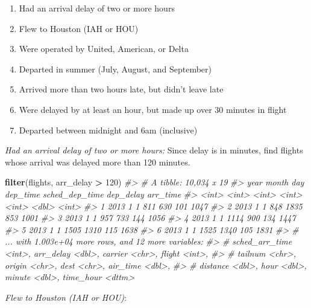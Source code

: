\documentclass[]{book}
\newenvironment{Shaded}{\begin{snugshade}}{\end{snugshade}}
\newcommand{\CommentTok}[1]{\textcolor[rgb]{0.56,0.35,0.01}{\textit{#1}}}
\newcommand{\DecValTok}[1]{\textcolor[rgb]{0.00,0.00,0.81}{#1}}
\newcommand{\KeywordTok}[1]{\textcolor[rgb]{0.13,0.29,0.53}{\textbf{#1}}}
\newcommand{\NormalTok}[1]{#1}
\newcommand{\OperatorTok}[1]{\textcolor[rgb]{0.81,0.36,0.00}{\textbf{#1}}}
\newcommand{\StringTok}[1]{\textcolor[rgb]{0.31,0.60,0.02}{#1}}
\providecommand{\tightlist}{%
  \setlength{\itemsep}{0pt}\setlength{\parskip}{0pt}}
\theoremstyle{plain}
\theoremstyle{remark}
\theoremstyle{definition}
\theoremstyle{definition}
\theoremstyle{definition}
\theoremstyle{remark}
\begin{document}
\begin{enumerate}
\def\labelenumi{\arabic{enumi}.}
\tightlist
\item
  Had an arrival delay of two or more hours
\item
  Flew to Houston (IAH or HOU)
\item
  Were operated by United, American, or Delta
\item
  Departed in summer (July, August, and September)
\item
  Arrived more than two hours late, but didn't leave late
\item
  Were delayed by at least an hour, but made up over 30 minutes in
  flight
\item
  Departed between midnight and 6am (inclusive)
\end{enumerate}

\emph{Had an arrival delay of two or more hours:} Since delay is in
minutes, find flights whose arrival was delayed more than 120 minutes.

\begin{Shaded}
\begin{Highlighting}[]
\KeywordTok{filter}\NormalTok{(flights, arr_delay }\OperatorTok{>}\StringTok{ }\DecValTok{120}\NormalTok{)}
\CommentTok{#> # A tibble: 10,034 x 19}
\CommentTok{#>    year month   day dep_time sched_dep_time dep_delay arr_time}
\CommentTok{#>   <int> <int> <int>    <int>          <int>     <dbl>    <int>}
\CommentTok{#> 1  2013     1     1      811            630       101     1047}
\CommentTok{#> 2  2013     1     1      848           1835       853     1001}
\CommentTok{#> 3  2013     1     1      957            733       144     1056}
\CommentTok{#> 4  2013     1     1     1114            900       134     1447}
\CommentTok{#> 5  2013     1     1     1505           1310       115     1638}
\CommentTok{#> 6  2013     1     1     1525           1340       105     1831}
\CommentTok{#> # ... with 1.003e+04 more rows, and 12 more variables:}
\CommentTok{#> #   sched_arr_time <int>, arr_delay <dbl>, carrier <chr>, flight <int>,}
\CommentTok{#> #   tailnum <chr>, origin <chr>, dest <chr>, air_time <dbl>,}
\CommentTok{#> #   distance <dbl>, hour <dbl>, minute <dbl>, time_hour <dttm>}
\end{Highlighting}
\end{Shaded}

\emph{Flew to Houston (IAH or HOU)}:
\end{document}
